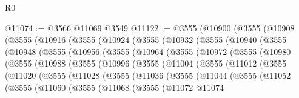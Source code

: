 \begin{lexlean}{R0}
\begin{coremodule}
@11074 := @3566 @11069 @3549
@11122 := @3555
    (@10900
      (@3555
        (@10908
          (@3555
            (@10916
              (@3555
                (@10924
                  (@3555
                    (@10932
                      (@3555
                        (@10940
                          (@3555
                            (@10948
                              (@3555
                                (@10956
                                  (@3555
                                    (@10964
                                      (@3555
                                        (@10972
                                          (@3555
                                            (@10980
                                              (@3555
                                                (@10988
                                                  (@3555
                                                    (@10996
                                                      (@3555
                                                        (@11004
                                                          (@3555
                                                            (@11012
                                                              (@3555
                                                                (@11020
                                                                  (@3555
                                                                    (@11028
                                                                      (@3555
                                                                        (@11036
                                                                          (@3555
                                                                            (@11044
                                                                              (@3555
                                                                                (@11052
                                                                                  (@3555
                                                                                    (@11060
                                                                                      (@3555
                                                                                        (@11068
                                                                                          (@3555
                                                                                            (@11072
                                                                                              @11074

\end{coremodule}
\end{lexlean}
